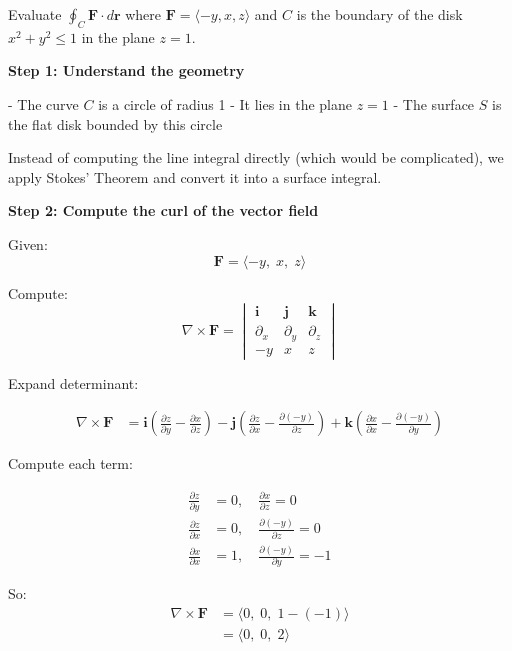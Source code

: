 \begin{examplebox}
    Evaluate $\oint_C \mathbf{F}\cdot d\mathbf{r}$ where $\mathbf{F}=\langle -y,x,z\rangle$ and $C$ is the boundary of the disk $x^2+y^2\le1$ in the plane $z=1$.

    \textbf{Step 1: Understand the geometry}

    - The curve $C$ is a circle of radius 1
    - It lies in the plane $z=1$
    - The surface $S$ is the flat disk bounded by this circle

    Instead of computing the line integral directly (which would be complicated), we apply Stokes’ Theorem and convert it into a surface integral.

    \textbf{Step 2: Compute the curl of the vector field}

    Given:
    \[
        \mathbf{F} = \langle -y,\; x,\; z \rangle
    \]

    Compute:
    \[
        \nabla \times \mathbf{F}
        =
        \begin{vmatrix}
            \mathbf{i} & \mathbf{j} & \mathbf{k} \\
            \partial_x & \partial_y & \partial_z \\
            -y         & x          & z
        \end{vmatrix}
    \]

    Expand determinant:

    \begin{align*}
        \nabla \times \mathbf{F}
         & = \mathbf{i}\left(\frac{\partial z}{\partial y} - \frac{\partial x}{\partial z}\right)
        - \mathbf{j}\left(\frac{\partial z}{\partial x} - \frac{\partial (-y)}{\partial z}\right)
        + \mathbf{k}\left(\frac{\partial x}{\partial x} - \frac{\partial (-y)}{\partial y}\right)
    \end{align*}

    Compute each term:

    \begin{align*}
        \frac{\partial z}{\partial y} & = 0, \quad \frac{\partial x}{\partial z} = 0     \\
        \frac{\partial z}{\partial x} & = 0, \quad \frac{\partial (-y)}{\partial z} = 0  \\
        \frac{\partial x}{\partial x} & = 1, \quad \frac{\partial (-y)}{\partial y} = -1
    \end{align*}

    So:
    \begin{align*}
        \nabla \times \mathbf{F}
         & = \langle 0,\; 0,\; 1 - (-1) \rangle \\
         & = \langle 0,\; 0,\; 2 \rangle
    \end{align*}


\end{examplebox}
